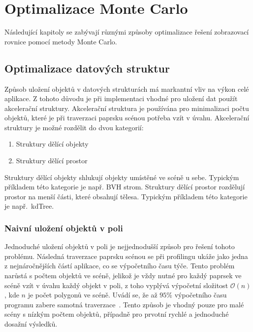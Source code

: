 \documentclass[czech,master]{diploma}
\begin{document}
\clearpage
\chapter{Optimalizace Monte Carlo}\label{sec:reduction}
Následující kapitoly se zabývají různými způsoby optimalizace řešení zobrazovací rovnice pomocí metody Monte Carlo.

\section{Optimalizace datových struktur}
Způsob uložení objektů v datových strukturách má markantní vliv na výkon celé aplikace. Z tohoto důvodu je při implementaci vhodné pro uložení dat použít akcelerační struktury. Akcelerační struktura je používána pro minimalizaci počtu objektů, které je při traverzaci paprsku scénou potřeba vzít v úvahu. Akcelerační struktury je možné rozdělit do dvou kategorií:
\begin{enumerate}
  \item Struktury dělící objekty
  \item Struktury dělící prostor
\end{enumerate}
\par
Struktury dělící objekty shlukují objekty umístěné ve scéně u sebe. Typickým příkladem této kategorie je např. BVH strom. Struktury dělící prostor rozdělují prostor na menší části, které obsahují tělesa. Typickým příkladem této kategorie je např.\ kdTree.

\subsection{Naivní uložení objektů v poli}
Jednoduché uložení objektů v poli je nejjednodušší způsob pro řešení tohoto problému. Následná traverzace paprsku scénou se při profilingu ukáže jako jedna z nejnáročnějších částí aplikace, co se výpočetního času týče. Tento problém narůstá s počtem objektů ve scéně, jelikož je vždy nutné pro každý paprsek ve scéně vzít v úvahu každý objekt v poli, z toho vyplývá výpočetní složitost \(\mathcal{O}(n)\), kde \(n\) je počet polygonů ve scéně. Uvádí se, že až \(95\%\) výpočetního času programu zabere samotná traverzace~\cite{Meister2018}. Tento způsob je vhodný pouze pro malé scény s nízkým počtem objektů, případně pro prvotní rychlé a jednoduché dosažní výsledků.
\end{document}
